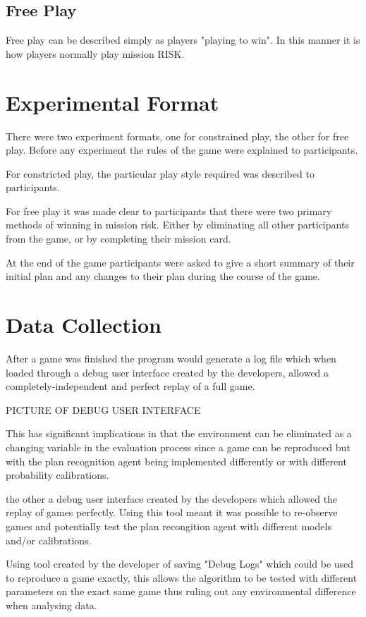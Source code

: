 \documentclass[parskip]{cs4rep}
\begin{document}
\subsection{Free Play}

Free play can be described simply as players "playing to win". In this manner it is how players normally play mission RISK.

\section{Experimental Format}

There were two experiment formats, one for constrained play, the other for free play. Before any experiment the rules of the game were explained to participants. 

For constricted play, the particular play style required was described to participants.

For free play it was made clear to participants that there were two primary methods of winning in mission risk. Either by eliminating all other participants from the game, or by completing their mission card.

At the end of the game participants were asked to give a short summary of their initial plan and any changes to their plan during the course of the game.

\section{Data Collection}

After a game was finished the program would generate a log file which when loaded through a debug user interface created by the developers, allowed a completely-independent and perfect replay of a full game. 

PICTURE OF DEBUG USER INTERFACE

This has significant implications in that the environment can be eliminated as a changing variable in the evaluation process since a game can be reproduced but with the plan recognition agent being implemented differently or with different probability calibrations. 

the other a debug user interface created by the developers which allowed the replay of games perfectly. Using this tool meant it was possible to re-observe games and potentially test the plan recongition agent with different models and/or calibrations.

Using tool created by the developer of saving "Debug Logs" which could be used to reproduce a game exactly, this allows the algorithm to be tested with different parameters on the exact same game thus ruling out any environmental difference when analysing data.
\end{document}
